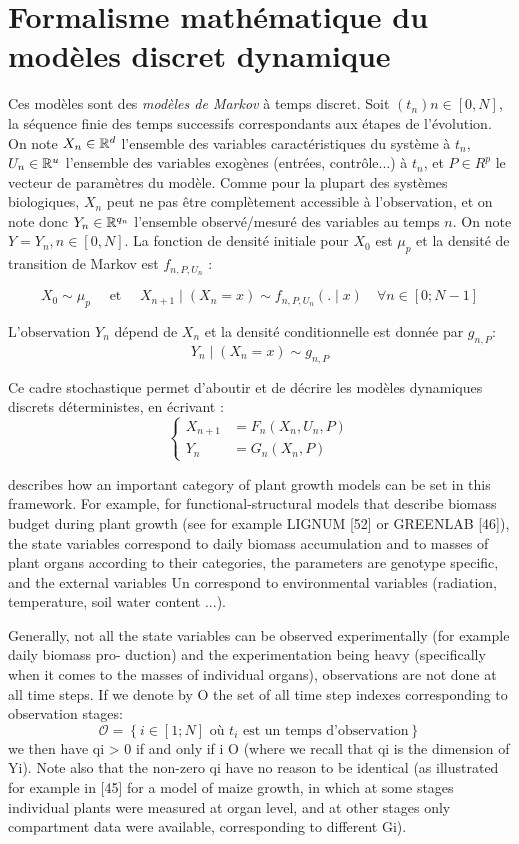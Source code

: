 \section{Formalisme mathématique du modèles discret dynamique}

Ces modèles sont des \emph{modèles de Markov} à temps discret. 
Soit $(t_{n}) n \in [0,N]$, la séquence finie des temps successifs correspondants
aux étapes de l’évolution. On note $X_{n}\in \mathbb{R}^d$
l'ensemble des variables caractéristiques du système à $t_{n}$, $U_n \in \mathbb{R}^u$
l'ensemble des variables exogènes (entrées, contrôle...) à $t_{n}$,
et $P\in R^p$ le vecteur de paramètres du modèle.
Comme pour la plupart des systèmes biologiques, $X_{n}$ peut ne pas être
complètement accessible à l'observation, et on note donc $Y_n \in \mathbb{R}^{q_n}$
l'ensemble observé/mesuré des variables au temps $n$.
On note $Y=Y_n, n \in [0,N]$.
La fonction de densité initiale pour $X_0$ est $\mu_p$ 
et la densité de transition de Markov est $f_{n,P,U_n}$ :

\[
	X_0 \sim \mu_p \quad \text{ et } \quad
	 X_{n+1} \mid (X_n=x) \sim f_{n,P,U_n}(.\mid x)	\quad \forall n \in [0;N-1]
\]

L'observation $Y_n$ dépend de $X_n$ et la densité conditionnelle 
est donnée par $g_{n,P}$:
\[Y_n \mid (X_n = x) \sim g_{n,P} \]

Ce cadre stochastique permet d'aboutir et de décrire les modèles dynamiques discrets déterministes, en écrivant : 
\[
\left\{
    \begin{array}{ll}
        X_{n+1} &= F_n(X_n,U_n,P) \\
        Y_n &= G_n(X_n,P)
    \end{array}
\right.
\]

describes how an important category of plant growth models can be set in this framework. For example, for functional-structural models that describe biomass budget during plant growth (see for example LIGNUM [52] or GREENLAB [46]), the state variables correspond to daily biomass accumulation and to masses of plant organs according to their categories, the parameters are genotype specific, and the external variables Un correspond to environmental variables (radiation, temperature, soil water content ...).

Generally, not all the state variables can be observed experimentally (for example daily biomass pro- duction) and the experimentation being heavy (specifically when it comes to the masses of individual organs), observations are not done at all time steps. If we denote by O the set of all time step indexes corresponding to observation stages:
\[
  \mathcal{O} = \left\{i \in [1; N ] \text{ où } 
  t_i \text{ est un temps d'observation}\right\} 
\]
we then have qi > 0 if and only if i  O (where we recall that qi is the dimension of Yi). Note also that the non-zero qi have no reason to be identical (as illustrated for example in [45] for a model of maize growth, in which at some stages individual plants were measured at organ level, and at other stages only compartment data were available, corresponding to different Gi).
